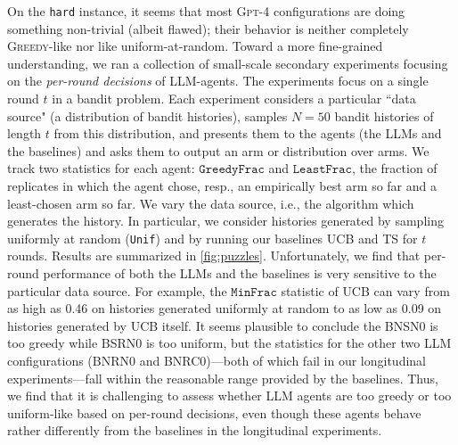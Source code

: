 \documentclass[11pt]{article}
\newcommand{\loose}{\looseness=-1}
\newcommand{\gptfour}{\textsc{Gpt-4}\xspace}
\newcommand{\ucb}{\textsc{UCB}\xspace}
\newcommand{\ts}{\textsc{TS}\xspace}
\newcommand{\greedy}{\textsc{Greedy}\xspace}
\newcommand{\MinFrac}{\texttt{MinFrac}}
\newcommand{\LeastFrac}{\texttt{LeastFrac}}
\newcommand{\GreedyFrac}{\texttt{GreedyFrac}}
\newcommand{\hard}{\texttt{hard}\xspace}
\begin{document}
On the \hard instance, it seems that most \gptfour configurations are
doing something non-trivial (albeit flawed); their behavior is neither
completely \greedy-like nor like uniform-at-random.
Toward a more fine-grained understanding, we ran a collection of small-scale secondary experiments focusing on the \emph{per-round decisions} of LLM-agents.
The experiments focus on a single round $t$ in a bandit problem. Each
experiment considers a particular ``data source" (a distribution of
bandit histories), samples $N=50$ bandit histories of length $t$ from this
distribution, and presents them to the agents (the LLMs and the
baselines) and asks them to output an arm or distribution over
  arms. We track two statistics for each agent: $\GreedyFrac$ and
$\LeastFrac$, the fraction of replicates in which the agent chose,
resp., an empirically best arm so far and a least-chosen arm so
far. We vary the data source, i.e., the algorithm which generates the
history. In particular, we consider histories generated by sampling
uniformly at random (\texttt{Unif}) and by running our baselines \ucb
and \ts for $t$ rounds.\loose
Results are summarized in \cref{fig:puzzles}.  Unfortunately, we
find that per-round performance of both the LLMs and the baselines is very
sensitive to the particular data source. For example, the $\MinFrac$
statistic of \ucb can vary from as high as 0.46 on histories generated
uniformly at random to as low as 0.09 on histories generated by \ucb
itself. It seems plausible to conclude the BNSN0 is too greedy while
BSRN0 is too uniform, but the statistics for the other two LLM
configurations (BNRN0 and BNRC0)---both of which fail in our
longitudinal experiments---fall within the reasonable range provided
by the baselines.  Thus, we find that it is challenging to assess whether
LLM agents are too greedy or too uniform-like based on per-round
decisions, even though these agents behave rather differently from the
baselines in the longitudinal experiments.
\end{document}
